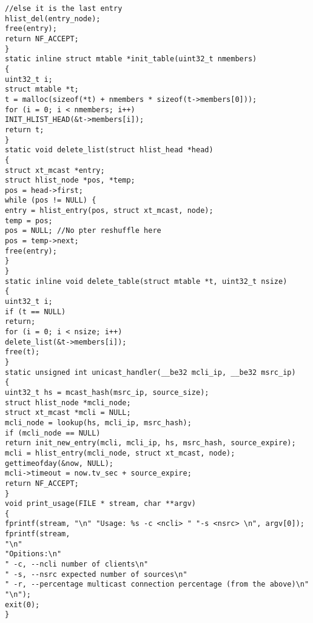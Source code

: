 \begin{verbatim}
//else it is the last entry
hlist_del(entry_node);
free(entry);
return NF_ACCEPT;
}
static inline struct mtable *init_table(uint32_t nmembers)
{
uint32_t i;
struct mtable *t;
t = malloc(sizeof(*t) + nmembers * sizeof(t->members[0]));
for (i = 0; i < nmembers; i++)
INIT_HLIST_HEAD(&t->members[i]);
return t;
}
static void delete_list(struct hlist_head *head)
{
struct xt_mcast *entry;
struct hlist_node *pos, *temp;
pos = head->first;
while (pos != NULL) {
entry = hlist_entry(pos, struct xt_mcast, node);
temp = pos;
pos = NULL; //No pter reshuffle here
pos = temp->next;
free(entry);
}
}
static inline void delete_table(struct mtable *t, uint32_t nsize)
{
uint32_t i;
if (t == NULL)
return;
for (i = 0; i < nsize; i++)
delete_list(&t->members[i]);
free(t);
}
static unsigned int unicast_handler(__be32 mcli_ip, __be32 msrc_ip)
{
uint32_t hs = mcast_hash(msrc_ip, source_size);
struct hlist_node *mcli_node;
struct xt_mcast *mcli = NULL;
mcli_node = lookup(hs, mcli_ip, msrc_hash);
if (mcli_node == NULL)
return init_new_entry(mcli, mcli_ip, hs, msrc_hash, source_expire);
mcli = hlist_entry(mcli_node, struct xt_mcast, node);
gettimeofday(&now, NULL);
mcli->timeout = now.tv_sec + source_expire;
return NF_ACCEPT;
}
void print_usage(FILE * stream, char **argv)
{
fprintf(stream, "\n" "Usage: %s -c <ncli> " "-s <nsrc> \n", argv[0]);
fprintf(stream,
"\n"
"Opitions:\n"
" -c, --ncli number of clients\n"
" -s, --nsrc expected number of sources\n"
" -r, --percentage multicast connection percentage (from the above)\n"
"\n");
exit(0);
}
\end{verbatim}
\backmatter
\newcommand{\refname}{References}
\renewcommand{\bibname}{References}
\addcontentsline{toc}{chapter}{\bibname}
